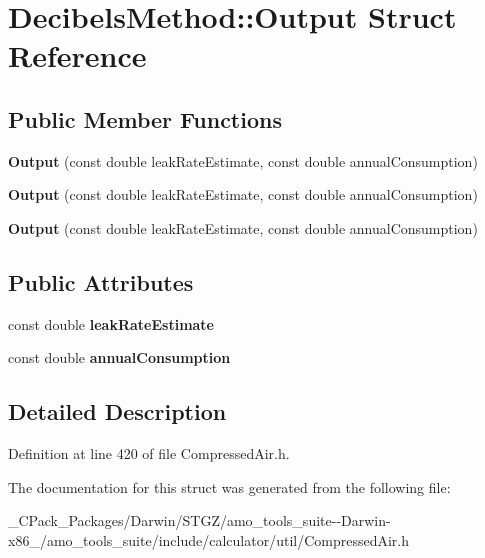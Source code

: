 \hypertarget{struct_decibels_method_1_1_output}{}\section{Decibels\+Method\+:\+:Output Struct Reference}
\label{struct_decibels_method_1_1_output}
\subsection*{Public Member Functions}
\begin{DoxyCompactItemize}
\item 
\mbox{\label{struct_decibels_method_1_1_output_a66f8a22e6632006c892cc7d02b00b7e7}} 
{\bfseries Output} (const double leak\+Rate\+Estimate, const double annual\+Consumption)
\item 
\mbox{\label{struct_decibels_method_1_1_output_a66f8a22e6632006c892cc7d02b00b7e7}} 
{\bfseries Output} (const double leak\+Rate\+Estimate, const double annual\+Consumption)
\item 
\mbox{\label{struct_decibels_method_1_1_output_a66f8a22e6632006c892cc7d02b00b7e7}} 
{\bfseries Output} (const double leak\+Rate\+Estimate, const double annual\+Consumption)
\end{DoxyCompactItemize}
\subsection*{Public Attributes}
\begin{DoxyCompactItemize}
\item 
\mbox{\label{struct_decibels_method_1_1_output_af16568fdacaca72109b5a677a47832bc}} 
const double {\bfseries leak\+Rate\+Estimate}
\item 
\mbox{\label{struct_decibels_method_1_1_output_a50b1de5174a223ec075d89e546a7c968}} 
const double {\bfseries annual\+Consumption}
\end{DoxyCompactItemize}


\subsection{Detailed Description}


Definition at line 420 of file Compressed\+Air.\+h.



The documentation for this struct was generated from the following file\+:\begin{DoxyCompactItemize}
\item 
\+\_\+\+C\+Pack\+\_\+\+Packages/\+Darwin/\+S\+T\+G\+Z/amo\+\_\+tools\+\_\+suite-\/-\/\+Darwin-\/x86\+\_/amo\+\_\+tools\+\_\+suite/include/calculator/util/Compressed\+Air.\+h\end{DoxyCompactItemize}
